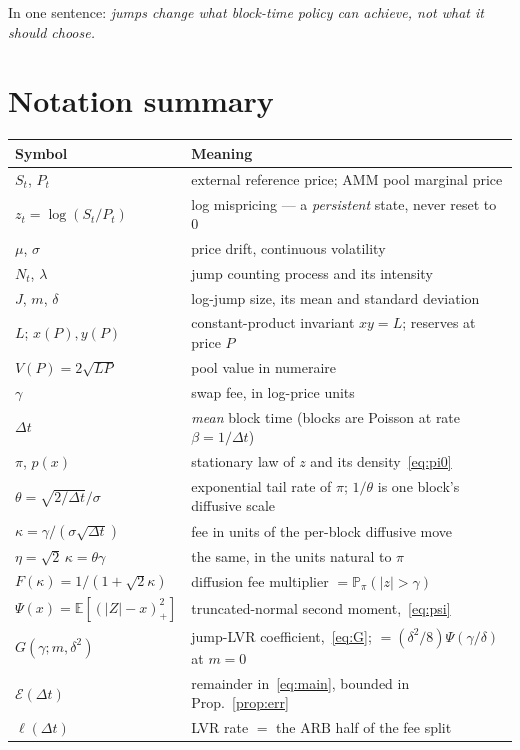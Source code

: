 \documentclass[11pt]{article}
\theoremstyle{definition}
\theoremstyle{remark}
\newcommand{\E}{\mathbb{E}}
\newcommand{\Prob}{\mathbb{P}}
\newcommand{\dt}{\Delta t}
\newcommand{\1}{\mathbf{1}}
\begin{document}
\noindent In one sentence: \emph{jumps change what block-time policy can achieve, not what it should choose.}

\section*{Notation summary}

\begin{center}
\begin{tabular}{ll}
\toprule
Symbol & Meaning \\
\midrule
$S_t$, $P_t$ & external reference price; AMM pool marginal price \\
$z_t = \log(S_t/P_t)$ & log mispricing --- a \emph{persistent} state, never reset to $0$ \\
$\mu$, $\sigma$ & price drift, continuous volatility \\
$N_t$, $\lambda$ & jump counting process and its intensity \\
$J$, $m$, $\delta$ & log-jump size, its mean and standard deviation \\
$L$; $x(P), y(P)$ & constant-product invariant $xy = L$; reserves at price $P$ \\
$V(P) = 2\sqrt{LP}$ & pool value in numeraire \\
$\gamma$ & swap fee, in log-price units \\
$\dt$ & \emph{mean} block time (blocks are Poisson at rate $\beta = 1/\dt$) \\
$\pi$, $p(x)$ & stationary law of $z$ and its density~\eqref{eq:pi0} \\
$\theta = \sqrt{2/\dt}/\sigma$ & exponential tail rate of $\pi$; $1/\theta$ is one block's diffusive scale \\
$\kappa = \gamma/(\sigma\sqrt{\dt})$ & fee in units of the per-block diffusive move \\
$\eta = \sqrt2\,\kappa = \theta\gamma$ & the same, in the units natural to $\pi$ \\
$F(\kappa) = 1/(1+\sqrt2\kappa)$ & diffusion fee multiplier $=\Prob_\pi(|z|>\gamma)$ \\
$\Psi(x) = \E[(|Z|-x)_+^2]$ & truncated-normal second moment,~\eqref{eq:psi} \\
$G(\gamma;m,\delta^2)$ & jump-LVR coefficient,~\eqref{eq:G}; $=(\delta^2/8)\Psi(\gamma/\delta)$ at $m=0$ \\
$\mathcal E(\dt)$ & remainder in~\eqref{eq:main}, bounded in Prop.~\ref{prop:err} \\
$\ell(\dt)$ & LVR rate $=$ the $\mathrm{ARB}$ half of the fee split \\

\end{tabular}
\end{center}
\end{document}
